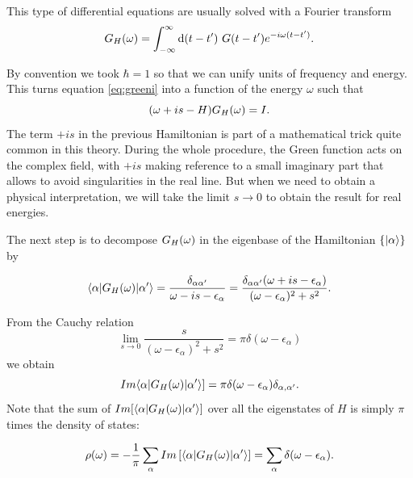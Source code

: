 \noindent This type of differential equations are usually solved with a Fourier transform 
\begin{equation}
    \Green{H}=\int_{-\infty}^{\infty}\text{d}(t-t')\ G(t-t')e^{-i\omega(t-t')}.
\end{equation}

\noindent By convention we took  $\hbar =1$ so that we can unify units of frequency and energy. This turns equation \eqref{eq:greeni} into a function of the energy $\omega$ such that 
\begin{equation} 
(\omega+is -H)G_{H}(\omega)=I. 
\end{equation}
\noindent The term $+is$ in the previous Hamiltonian is part of a mathematical trick quite common in this theory. During the whole procedure, the Green function acts on the complex field, with $+is$   making reference to a small imaginary part that allows to avoid singularities in the real line. But when we need to obtain a physical interpretation, we will take the limit $s\rightarrow0$ to obtain the result for real energies. 

The next step is to decompose $G_{H}(\omega)$ in the eigenbase of the Hamiltonian $\{\vert \alpha \rangle\}$  by 


\begin{equation}
    \langle \alpha  \vert G_{H}(\omega)\vert \alpha' \rangle=\frac{\delta_{\alpha\alpha'}}{\omega - is -\epsilon_\alpha}=\frac{\delta_{\alpha\alpha'}(\omega + is -\epsilon_\alpha)}{(\omega-\epsilon_{\alpha})^{2}+s^{2}}.
\end{equation}

From the Cauchy relation            
\begin{equation}
\lim_{s\rightarrow0}\frac{s}{(\omega-\epsilon_{\alpha})^{2}+s^{2}}=\pi\delta(\omega-\epsilon_{\alpha})
\end{equation}
we obtain 
\begin{equation}
    Im \langle \alpha  \vert G_{H}(\omega)\vert \alpha' \rangle] = \pi \delta(\omega -\epsilon_\alpha)\delta_{\alpha,\alpha'}.
\end{equation}
Note that the sum of $Im[ \langle \alpha  \vert G_{H}(\omega)\vert \alpha' \rangle]$ over all the eigenstates of $H$ is simply $\pi$ times the density of states:

\begin{equation}
    \rho(\omega)=-\frac{1}{\pi} \sum_\alpha Im \left[ \langle \alpha  \vert G_{H}(\omega)\vert \alpha' \rangle\right] = \sum_\alpha \delta(\omega-\epsilon_\alpha) . \label{eq:DOS_def}
\end{equation}

